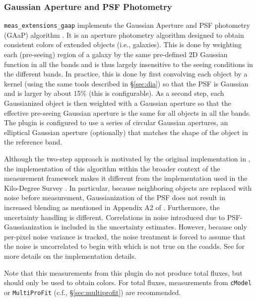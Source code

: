 \subsubsection{Gaussian Aperture and PSF Photometry}
\label{sec:gaap}

\texttt{meas\_extensions\_gaap} implements the Gaussian Aperture and PSF photometry (GAaP) algorithm \citep{2008A&A...482.1053K}.
It is an aperture photometry algorithm designed to obtain consistent colors of extended objects (i.e., galaxies).
This is done by weighting each (pre-seeing) region of a galaxy by the same pre-defined 2D Gaussian function in all the bands and is thus largely insensitive to the seeing conditions in the different bands.
In practice, this is done by first convolving each object by a kernel (using the same tools described in \S\ref{sec:dia}) so that the PSF is Gaussian and is larger by about 15\% (this is configurable).
As a second step, each Gaussianized object is then weighted with a Gaussian aperture so that the effective pre-seeing Gaussian aperture is the same for all objects in all the bands.
The plugin is configured to use a series of circular Gaussian apertures, an elliptical Gaussian aperture (optionally) that matches the shape of the object in the reference band.

Although the two-step approach is motivated by the original implementation in \citet{2008A&A...482.1053K}, the implementation of this algorithm within the broader context of the measurement framework makes it different from the implementation used in the Kilo-Degree Survey \citep[KiDS;][]{2025arXiv250319439W}.
In particular, because neighboring objects are replaced with noise before measurement, Gaussianization of the PSF does not result in increased blending as mentioned in Appendix A2 of \citet{2015MNRAS.454.3500K}.
Furthermore, the uncertainty handling is different.
Correlations in noise introduced due to PSF-Gaussianization is included in the uncertainty estimates.
However, because only per-pixel noise variance is tracked, the noise treatment is forced to assume that the noise is uncorrelated to begin with which is not true on the coadds.
See \citet{DMTN-190} for more details on the implementation details.

Note that this measurements from this plugin do not produce total fluxes, but should only be used to obtain colors.
For total fluxes, measurements from \texttt{cModel} or \texttt{MultiProFit} (c.f., \S\ref{sec:multiprofit}) are recommended.
